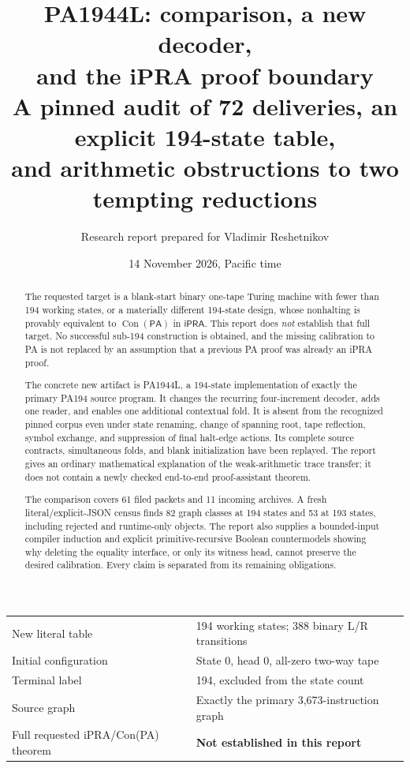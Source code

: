 \documentclass[10pt,letterpaper]{article}
\title{\textbf{PA1944L: comparison, a new decoder,\\and the iPRA proof boundary}\\[5pt]
  \large A pinned audit of 72 deliveries, an explicit 194-state table,\\
  and arithmetic obstructions to two tempting reductions}
\author{Research report prepared for Vladimir Reshetnikov}
\date{14 November 2026, Pacific time}
\newcommand{\ipra}{\mathsf{iPRA}}
\newcommand{\pa}{\mathsf{PA}}
\newcommand{\Con}{\operatorname{Con}}
\begin{document}
\maketitle
\begin{abstract}
The requested target is a blank-start binary one-tape Turing machine with
fewer than 194 working states, or a materially different 194-state design,
whose nonhalting is provably equivalent to $\Con(\pa)$ in $\ipra$.
This report does \emph{not} establish that full target. No successful
sub-194 construction is obtained, and the missing calibration to PA is not
replaced by an assumption that a previous PA proof was already an iPRA proof.

The concrete new artifact is PA1944L, a 194-state implementation of exactly
the primary PA194 source program. It changes the recurring four-increment
decoder, adds one reader, and enables one additional contextual fold. It
is absent from the recognized pinned corpus even under state renaming,
change of spanning root, tape reflection, symbol exchange, and suppression
of final halt-edge actions. Its complete source contracts, simultaneous
folds, and blank initialization have been replayed. The report gives an
ordinary mathematical explanation of the weak-arithmetic trace transfer;
it does not contain a newly checked end-to-end proof-assistant theorem.

The comparison covers 61 filed packets and 11 incoming archives. A fresh
literal/explicit-JSON census finds 82 graph classes at 194 states and 53
at 193 states, including rejected and runtime-only objects. The report
also supplies a bounded-input compiler induction and explicit
primitive-recursive Boolean countermodels showing why deleting the
equality interface, or only its witness head, cannot preserve the desired
calibration. Every claim is separated from its remaining obligations.
\end{abstract}

\begin{center}
\begin{tabular}{@{}ll@{}}
\toprule
New literal table & 194 working states; 388 binary L/R transitions\\
Initial configuration & State 0, head 0, all-zero two-way tape\\
Terminal label & 194, excluded from the state count\\
Source graph & Exactly the primary 3,673-instruction graph\\
Full requested iPRA/Con(PA) theorem & \textbf{Not established in this report}\\
\bottomrule
\end{tabular}
\end{center}
\clearpage
\tableofcontents
\clearpage
\end{document}
